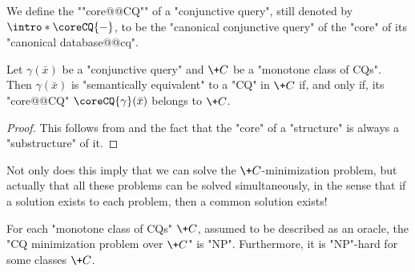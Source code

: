 We define the ""core@@CQ"" of a "conjunctive query", still denoted by $\intro*\coreCQ{-}$,
to be the "canonical conjunctive query" of the "core" of its "canonical database@@cq".
\begin{proposition}
	\AP\label{prop:minimization-CQ}
	Let $\gamma(\bar x)$ be a "conjunctive query" and $\+C$ be
	a "monotone class of CQs". Then $\gamma(\bar x)$ is "semantically equivalent"
	to a "CQ" in $\+C$ if, and only if, its "core@@CQ" $\coreCQ{\gamma}(\bar x)$
	belongs to $\+C$.
\end{proposition}

\begin{proof}
	This follows from 
	and the fact that the "core" of a "structure" is always
	a "substructure" of it.
\end{proof}

Not only does this imply that we can solve the $\+C$-minimization problem,
but actually that all these problems can be solved simultaneously,
in the sense that if a solution exists to each problem, then a common solution exists!


\begin{corollary}
	\AP\label{coro:decision-minimization-cq}
	For each "monotone class of CQs" $\+C$, assumed to be described as an oracle,
	the "CQ minimization problem over $\+C$" is "NP".
	Furthermore, it is "NP"-hard for some classes $\+C$.
\end{corollary}

